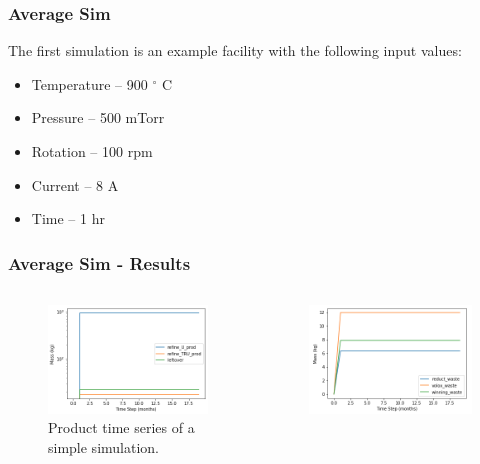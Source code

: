 \begin{frame}
\frametitle{Average Sim}
The first simulation is an example facility with the following input values:
\begin{itemize}
	\item Temperature -- 900 $^\circ$ C
	\item Pressure -- 500 mTorr
	\item Rotation -- 100 rpm
	\item Current -- 8 A
	\item Time -- 1 hr
\end{itemize}
\end{frame}

\begin{frame}
\frametitle{Average Sim - Results}
\begin{columns}
	\begin{column}{.5\textwidth}
		\begin{figure}
			\centering
			\includegraphics[width=\linewidth]{timeseries-prod}
			\caption{Product time series of a simple simulation.}
			\label{fig:timeseries-prod}
		\end{figure}
	\end{column}
	\begin{column}{.5\textwidth}
		\begin{figure}
			\centering
			\includegraphics[width=\linewidth]{timeseries-waste}

\end{figure}
\end{column}
\end{columns}
\end{frame}
